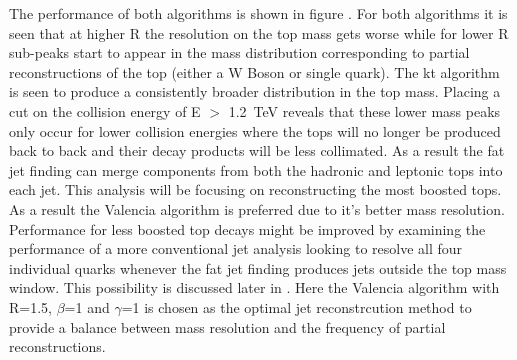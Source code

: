 The performance of both algorithms is shown in figure . For both algorithms it is seen that at higher R the resolution on the top mass gets worse while for lower R sub-peaks start to appear in the mass distribution corresponding to partial reconstructions of the top (either a W Boson or single quark). The kt algorithm is seen to produce a consistently broader distribution in the top mass. Placing a cut on the collision energy of E $>$ 1.2~TeV reveals that these lower mass peaks only occur for lower collision energies where the tops will no longer be produced back to back and their decay products will be less collimated. As a result the fat jet finding can merge components from both the hadronic and leptonic tops into each jet. This analysis will be focusing on reconstructing the most boosted tops. As a result the Valencia algorithm is preferred due to it's better mass resolution. Performance for less boosted top decays might be improved by examining the performance of a more conventional jet analysis looking to resolve all four individual quarks whenever the fat jet finding produces jets outside the top mass window. This possibility is discussed later in . Here the Valencia algorithm with R=1.5, $\beta$=1 and $\gamma$=1 is chosen as the optimal jet reconstrcution method to provide a balance between mass resolution and the frequency of partial reconstructions. 

